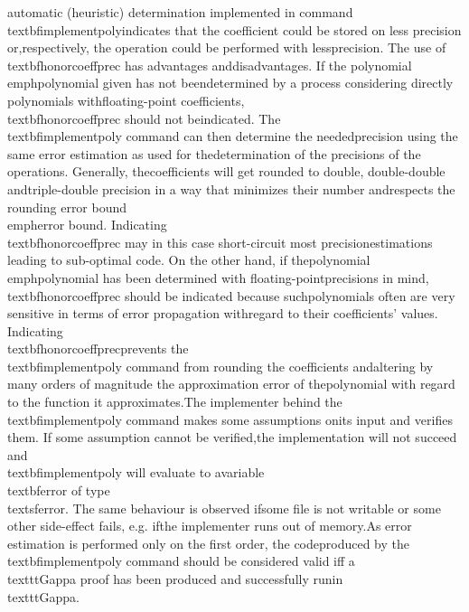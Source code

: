 \begin{itemize}
automatic (heuristic) determination implemented in command \\textbf{implementpoly}\n   indicates that the coefficient could be stored on less precision or,\n   respectively, the operation could be performed with less\n   precision. The use of \\textbf{honorcoeffprec} has advantages and\n   disadvantages. If the polynomial \\emph{polynomial} given has not been\n   determined by a process considering directly polynomials with\n   floating-point coefficients, \\textbf{honorcoeffprec} should not be\n   indicated. The \\textbf{implementpoly} command can then determine the needed\n   precision using the same error estimation as used for the\n   determination of the precisions of the operations. Generally, the\n   coefficients will get rounded to double, double-double and\n   triple-double precision in a way that minimizes their number and\n   respects the rounding error bound \\emph{error bound}.  Indicating\n   \\textbf{honorcoeffprec} may in this case short-circuit most precision\n   estimations leading to sub-optimal code. On the other hand, if the\n   polynomial \\emph{polynomial} has been determined with floating-point\n   precisions in mind, \\textbf{honorcoeffprec} should be indicated because such\n   polynomials often are very sensitive in terms of error propagation with\n   regard to their coefficients' values. Indicating \\textbf{honorcoeffprec}\n   prevents the \\textbf{implementpoly} command from rounding the coefficients and\n   altering by many orders of magnitude the approximation error of the\n   polynomial with regard to the function it approximates.\n    \n   The implementer behind the \\textbf{implementpoly} command makes some assumptions on\n   its input and verifies them. If some assumption cannot be verified,\n   the implementation will not succeed and \\textbf{implementpoly} will evaluate to a\n   variable \\textbf{error} of type \\textsf{error}. The same behaviour is observed if\n   some file is not writable or some other side-effect fails, e.g. if\n   the implementer runs out of memory.\n    \n   As error estimation is performed only on the first order, the code\n   produced by the \\textbf{implementpoly} command should be considered valid iff a\n   \\texttt{Gappa} proof has been produced and successfully run\n   in \\texttt{Gappa}.\n\end{itemize}
